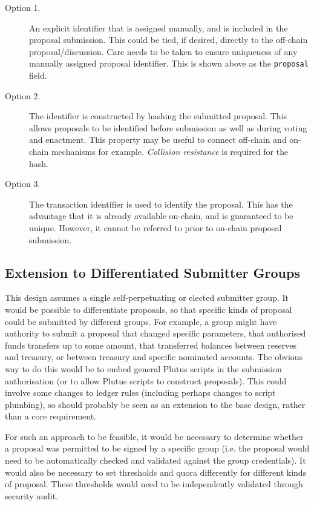 \begin{description}
\item
  [Option 1.]
  An explicit identifier that is assigned manually, and is included in the proposal submission.  This could be tied, if desired, directly to the off-chain proposal/discussion.
  Care needs to be taken to ensure uniqueness of any manually assigned proposal identifier.  This is shown above as the \texttt{proposal} field.
\item
  [Option 2.]
  The identifier is constructed by hashing the submitted proposal.  This allows proposals to be identified before submission as well as during voting and enactment.  This property may be
  useful to connect off-chain and on-chain mechanisms for example.  \emph{Collision resistance} is required for the hash. 
\item
  [Option 3.]
  The transaction identifier is used to identify the proposal.  This has the advantage that it is already available on-chain, and is guaranteed to be unique.  However, it cannot be
  referred to prior to on-chain proposal submission.
\end{description}

\subsection{Extension to Differentiated Submitter Groups}

This design assumes a single self-perpetuating or elected submitter group.  It
would be possible to differentiate proposals, so that specific kinds of proposal
could be submitted by different groups.  For example, a group might have
authority to submit a proposal that changed specific parameters, that authorised
funds transfers up to some amount, that transferred balances between reserves
and treasury, or between treasury and specific nominated accounts.  The obvious
way to do this would be to embed general Plutus scripts in the submission
authorisation (or to allow Plutus scripts to construct proposals).  This could
involve some changes to ledger rules (including perhaps changes to script
plumbing), so should probably be seen as an extension to the base design, rather
than a core requirement.  

For such an approach to be feasible, it would be necessary to determine whether
a proposal was permitted to be signed by a specific group (i.e. the proposal
would need to be automatically checked and validated against the group
credentials).  It would also be necessary to set thresholds and quora
differently for different kinds of proposal.  These thresholds would need to be
independently validated through security audit.
